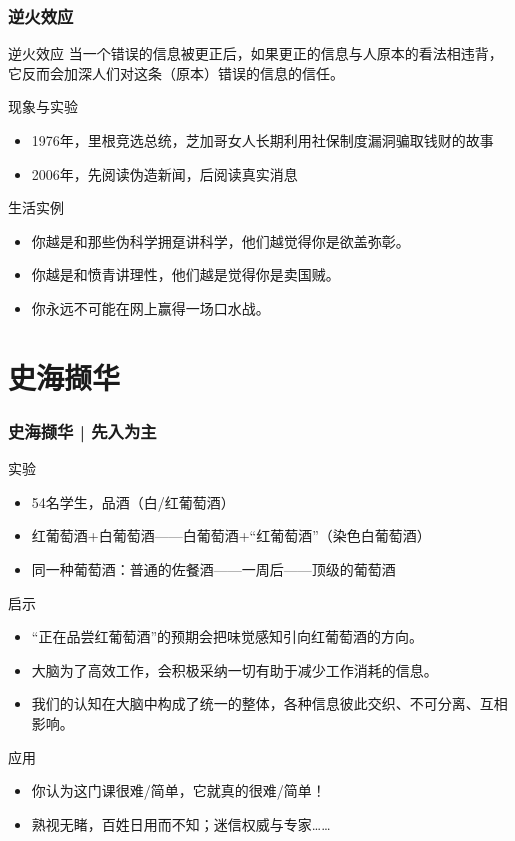 \begin{frame}
  \frametitle{逆火效应}
  \begin{block}{逆火效应}
    当一个错误的信息被更正后，如果更正的信息与人原本的看法相违背，它反而会加深人们对这条（原本）错误的信息的信任。
  \end{block}
  \pause
  \begin{block}{现象与实验}
    \begin{itemize}
      \item 1976年，里根竞选总统，芝加哥女人长期利用社保制度漏洞骗取钱财的故事
      \item 2006年，先阅读伪造新闻，后阅读真实消息
    \end{itemize}
  \end{block}
  \pause
  \begin{block}{生活实例}
    \begin{itemize}
      \item 你越是和那些伪科学拥趸讲科学，他们越觉得你是欲盖弥彰。
      \item 你越是和愤青讲理性，他们越是觉得你是卖国贼。
      \item 你永远不可能在网上赢得一场口水战。
    \end{itemize}
  \end{block}
\end{frame}

\section{史海撷华}
\begin{frame}
  \frametitle{史海撷华 | 先入为主}
  \begin{block}{实验}
    \begin{itemize}
      \item 54名学生，品酒（白/红葡萄酒）
      \item 红葡萄酒+白葡萄酒——白葡萄酒+“红葡萄酒”（染色白葡萄酒）
      \item 同一种葡萄酒：普通的佐餐酒——一周后——顶级的葡萄酒
    \end{itemize}
  \end{block}
  \pause
  \begin{block}{启示}
    \begin{itemize}
      \item “正在品尝红葡萄酒”的预期会把味觉感知引向红葡萄酒的方向。
      \item 大脑为了高效工作，会积极采纳一切有助于减少工作消耗的信息。
      \item 我们的认知在大脑中构成了统一的整体，各种信息彼此交织、不可分离、互相影响。
    \end{itemize}
  \end{block}
  \pause
  \begin{block}{应用}
    \begin{itemize}
      \item 你认为这门课很难/简单，它就真的很难/简单！
      \item 熟视无睹，百姓日用而不知；迷信权威与专家……
    \end{itemize}
  \end{block}
\end{frame}

